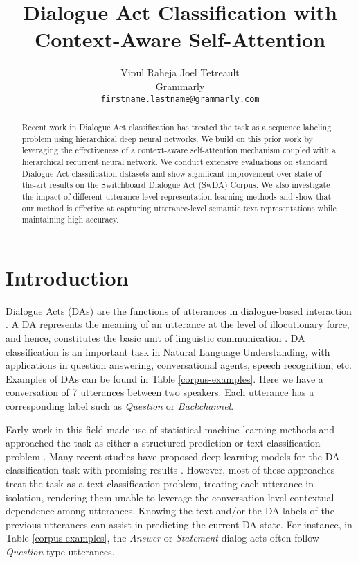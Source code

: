 \documentclass[11pt,a4paper]{article}
\title{Dialogue Act Classification with Context-Aware Self-Attention}
\author{Vipul Raheja \hspace{0.3cm} Joel Tetreault\\
  Grammarly \\
  {\tt firstname.lastname@grammarly.com} \\}
\date{}
\begin{document}
\maketitle
\begin{abstract}
Recent work in Dialogue Act classification has treated the task as a sequence labeling problem using hierarchical deep neural networks. We build on this prior work by leveraging the effectiveness of a context-aware self-attention mechanism coupled with a hierarchical recurrent neural network. We conduct extensive evaluations on standard Dialogue Act classification datasets and show significant improvement over state-of-the-art results on the Switchboard Dialogue Act (SwDA) Corpus. We also investigate the impact of different utterance-level representation learning methods and show that our method is effective at capturing utterance-level semantic text representations while maintaining high accuracy.
\end{abstract}

\section{Introduction}

Dialogue Acts (DAs) are the functions of utterances in dialogue-based interaction \cite{austin1975things}. A DA represents the meaning of an utterance at the level of illocutionary force, and hence, constitutes the basic unit of linguistic communication \cite{searle1969speech}. DA classification is an important task in Natural Language Understanding, with applications in question answering, conversational agents, speech recognition, etc. Examples of DAs can be found in Table \ref{corpus-examples}.  Here we have a conversation of 7 utterances between two speakers.  Each utterance has a corresponding label such as {\it Question} or {\it Backchannel}.





Early work in this field made use of statistical machine learning methods and approached the task as either a structured prediction or text classification problem \cite{stolcke2000dialogue, ang2005automatic, zimmermann2009joint, surendran2006dialog}. 
Many recent studies have proposed deep learning models for the DA classification task with promising results \cite{lee2016sequential,khanpour2016dialogue,ortega2017neural}. However, most of these approaches treat the task as a text classification problem, treating each utterance in isolation, rendering them unable to leverage the conversation-level contextual dependence among utterances. Knowing the text and/or the DA labels of the previous utterances can assist in predicting the current DA state. For instance, in Table \ref{corpus-examples}, the \textit{Answer} or \textit{Statement} dialog acts often follow \textit{Question} type utterances.
\end{document}
